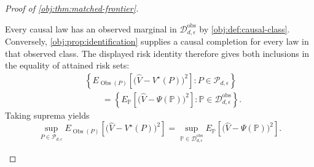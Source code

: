 \begin{proof}[Proof of \cref{obj:thm:matched-frontier}]
\begin{enumerate}
Every causal law has an observed marginal in \(\mathcal D_{d,\epsilon}^{\mathrm{obs}}\) by \cref{obj:def:causal-class}. Conversely, \cref{obj:prop:identification} supplies a causal completion for every law in that observed class. The displayed risk identity therefore gives both inclusions in the equality of attained risk sets:
\[
\begin{aligned}
&\left\{
E_{\operatorname{Obs}(P)}\!\left[
\bigl(\widehat V-V^\star(P)\bigr)^2
\right]:
P\in\mathcal P_{d,\epsilon}
\right\}
\\
&\qquad=
\left\{
E_{\mathbb P}\!\left[
\bigl(\widehat V-\Psi(\mathbb P)\bigr)^2
\right]:
\mathbb P\in\mathcal D_{d,\epsilon}^{\mathrm{obs}}
\right\}.
\end{aligned}
\]
Taking suprema yields
\[
\sup_{P\in\mathcal P_{d,\epsilon}}
E_{\operatorname{Obs}(P)}\!\left[
\bigl(\widehat V-V^\star(P)\bigr)^2
\right]
=
\sup_{\mathbb P\in\mathcal D_{d,\epsilon}^{\mathrm{obs}}}
E_{\mathbb P}\!\left[
\bigl(\widehat V-\Psi(\mathbb P)\bigr)^2
\right].
\]


\end{enumerate}
\end{proof}
